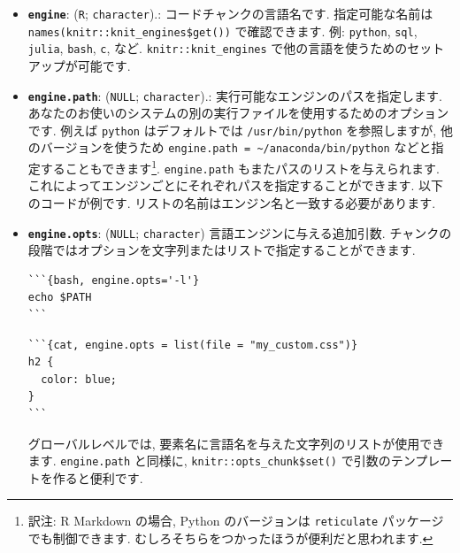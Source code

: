\documentclass[
  11pt,
  lualatex,ja=standard,jafont=noto]{bxjsreport}
\newenvironment{Shaded}{\begin{snugshade}}{\end{snugshade}}
\newcommand{\AttributeTok}[1]{\textcolor[rgb]{0.77,0.63,0.00}{#1}}
\newcommand{\FunctionTok}[1]{\textcolor[rgb]{0.00,0.00,0.00}{#1}}
\newcommand{\NormalTok}[1]{#1}
\newcommand{\SpecialCharTok}[1]{\textcolor[rgb]{0.00,0.00,0.00}{#1}}
\newcommand{\StringTok}[1]{\textcolor[rgb]{0.31,0.60,0.02}{#1}}
\begin{document}
\begin{itemize}
\item
  \textbf{\texttt{engine}}: (\texttt{\textquotesingle{}R\textquotesingle{}}; \texttt{character}).: コードチャンクの言語名です. 指定可能な名前は \texttt{names(knitr::knit\_engines\$get())} で確認できます. 例: \texttt{python}, \texttt{sql}, \texttt{julia}, \texttt{bash}, \texttt{c}, など. \texttt{knitr::knit\_engines} で他の言語を使うためのセットアップが可能です.
\item
  \textbf{\texttt{engine.path}}: (\texttt{NULL}; \texttt{character}).: 実行可能なエンジンのパスを指定します. あなたのお使いのシステムの別の実行ファイルを使用するためのオプションです. 例えば \texttt{python} はデフォルトでは \texttt{/usr/bin/python} を参照しますが, 他のバージョンを使うため \texttt{engine.path = \textquotesingle{}\textasciitilde{}/anaconda/bin/python\textquotesingle{}} などと指定することもできます\footnote{訳注: R Markdown の場合, Python のバージョンは \texttt{reticulate} パッケージでも制御できます. むしろそちらをつかったほうが便利だと思われます.}. \texttt{engine.path} もまたパスのリストを与えられます. これによってエンジンごとにそれぞれパスを指定することができます. 以下のコードが例です. リストの名前はエンジン名と一致する必要があります.

\begin{Shaded}
\end{Shaded}
\item
  \textbf{\texttt{engine.opts}}: (\texttt{NULL}; \texttt{character}) 言語エンジンに与える追加引数. チャンクの段階ではオプションを文字列またはリストで指定することができます.

\begin{verbatim}
```{bash, engine.opts='-l'}
echo $PATH
```
\end{verbatim}

\begin{verbatim}
```{cat, engine.opts = list(file = "my_custom.css")}
h2 {
  color: blue;
}
```
\end{verbatim}

  グローバルレベルでは, 要素名に言語名を与えた文字列のリストが使用できます. \texttt{engine.path} と同様に, \texttt{knitr::opts\_chunk\$set()} で引数のテンプレートを作ると便利です.


\end{itemize}
\end{document}
